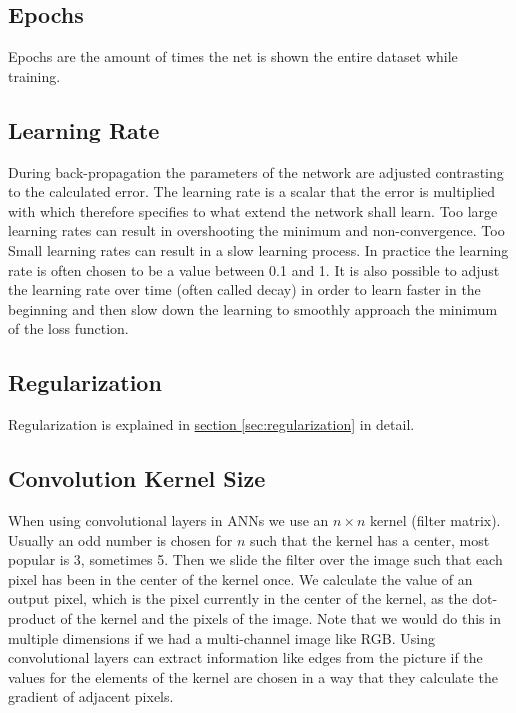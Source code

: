\subsection{Epochs}

Epochs are the amount of times the net is shown the entire dataset while training.

\subsection{Learning Rate}

During back-propagation the parameters of the network are adjusted contrasting to the calculated error. The learning rate is a scalar that the error is multiplied with which therefore specifies to what extend the network shall learn. Too large learning rates can result in overshooting the minimum and non-convergence. Too Small learning rates can result in a slow learning process. In practice the learning rate is often chosen to be a value between 0.1 and 1. It is also possible to adjust the learning rate over time (often called decay) in order to learn faster in the beginning and then slow down the learning to smoothly approach the minimum of the loss function.

\subsection{Regularization}

Regularization is explained in \hyperref[sec:regularization]{section \ref*{sec:regularization}} in detail.

\subsection{Convolution Kernel Size}

When using convolutional layers in ANNs we use an $n \times n$ kernel (filter matrix). Usually an odd number is chosen for $n$ such that the kernel has a center, most popular is 3, sometimes 5. Then we slide the filter over the image such that each pixel has been in the center of the kernel once. We calculate the value of an output pixel, which is the pixel currently in the center of the kernel, as the dot-product of the kernel and the pixels of the image. Note that we would do this in multiple dimensions if we had a multi-channel image like RGB. Using convolutional layers can extract information like edges from the picture if the values for the elements of the kernel are chosen in a way that they calculate the gradient of adjacent pixels.


